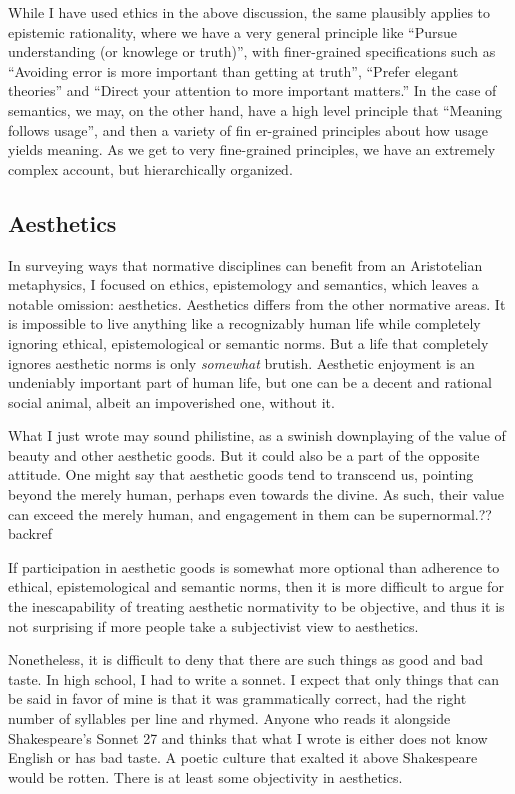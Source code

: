 While I have used ethics in the above discussion, the same plausibly applies to epistemic rationality, where we have a very general
principle like ``Pursue understanding (or knowlege or truth)'', with finer-grained specifications such as ``Avoiding error is more
important than getting at truth'', ``Prefer elegant theories'' and ``Direct your attention to more important matters.'' In the case
of semantics, we may, on the other hand, have a high level principle that ``Meaning follows usage'', and then a variety of fin er-grained 
principles about how usage yields meaning. As we get to very fine-grained principles, we have an extremely complex account, but hierarchically
organized.

\subsection{Aesthetics}
In surveying ways that normative disciplines can benefit from an Aristotelian metaphysics, I focused on 
ethics, epistemology and semantics, which leaves a notable omission: aesthetics. Aesthetics differs from
the other normative areas. It is impossible to live anything like a recognizably human 
life while completely ignoring ethical, epistemological or semantic norms. But a life that completely ignores 
aesthetic norms is only \textit{somewhat} brutish. Aesthetic enjoyment is an undeniably important part of 
human life, but one can be a decent and rational social animal, albeit an impoverished one, without it. 

What I just wrote may sound philistine, as a swinish downplaying of the value of beauty and other aesthetic
goods. But it could also be a part of the opposite attitude. One might say that aesthetic goods tend to 
transcend us, pointing beyond the merely human, perhaps even towards the divine. As such, their value can
exceed the merely human, and engagement in them can be supernormal.??backref

If participation in aesthetic goods is somewhat more optional than adherence to ethical, epistemological
and semantic norms, then it is more difficult to argue for the inescapability of treating aesthetic normativity
to be objective, and thus it is not surprising if more people take a subjectivist view to aesthetics.

Nonetheless, it is difficult to deny that there are such things as good and bad taste. In high school, I had
to write a sonnet. I expect that only things that can be said in favor of mine is that it was grammatically
correct, had the right number of syllables per line and rhymed. Anyone who reads it alongside Shakespeare's 
Sonnet 27 and thinks that what I wrote is either does not know English or has bad taste. A poetic culture 
that exalted it above Shakespeare would be rotten.  There is at least some objectivity in aesthetics.

